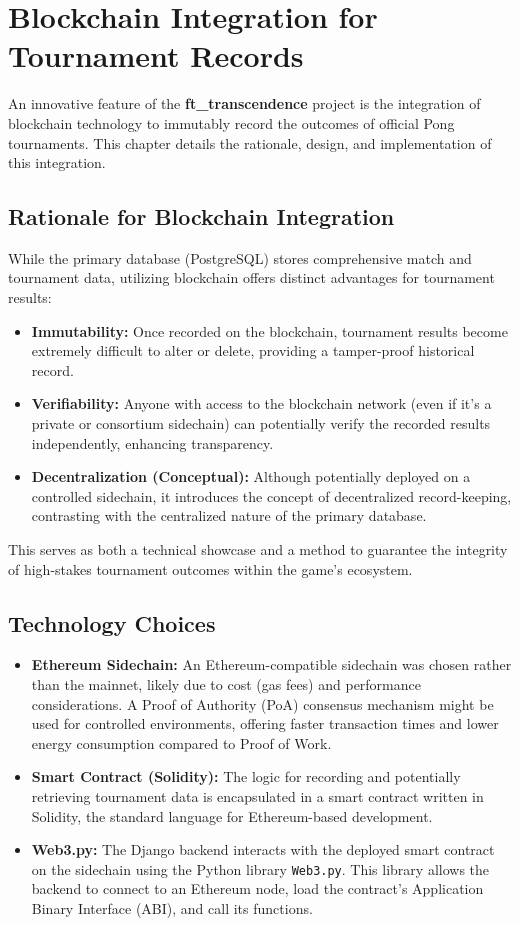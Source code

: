 \chapter{Blockchain Integration for Tournament Records}
\label{ch:blockchain}

An innovative feature of the \textbf{ft\_transcendence} project is the integration of blockchain technology to immutably record the outcomes of official Pong tournaments. This chapter details the rationale, design, and implementation of this integration.

\section{Rationale for Blockchain Integration}
\label{sec:blockchain_rationale}
While the primary database (PostgreSQL) stores comprehensive match and tournament data, utilizing blockchain offers distinct advantages for tournament results:
\begin{itemize}
    \item \textbf{Immutability:} Once recorded on the blockchain, tournament results become extremely difficult to alter or delete, providing a tamper-proof historical record.
    \item \textbf{Verifiability:} Anyone with access to the blockchain network (even if it's a private or consortium sidechain) can potentially verify the recorded results independently, enhancing transparency.
    \item \textbf{Decentralization (Conceptual):} Although potentially deployed on a controlled sidechain, it introduces the concept of decentralized record-keeping, contrasting with the centralized nature of the primary database.
\end{itemize}
This serves as both a technical showcase and a method to guarantee the integrity of high-stakes tournament outcomes within the game's ecosystem.

\section{Technology Choices}
\label{sec:blockchain_tech}
\begin{itemize}
    \item \textbf{Ethereum Sidechain:} An Ethereum-compatible sidechain was chosen rather than the mainnet, likely due to cost (gas fees) and performance considerations. A Proof of Authority (PoA) consensus mechanism might be used for controlled environments, offering faster transaction times and lower energy consumption compared to Proof of Work.
    \item \textbf{Smart Contract (Solidity):} The logic for recording and potentially retrieving tournament data is encapsulated in a smart contract written in Solidity, the standard language for Ethereum-based development.
    \item \textbf{Web3.py:} The Django backend interacts with the deployed smart contract on the sidechain using the Python library \texttt{Web3.py}. This library allows the backend to connect to an Ethereum node, load the contract's Application Binary Interface (ABI), and call its functions.
\end{itemize}

